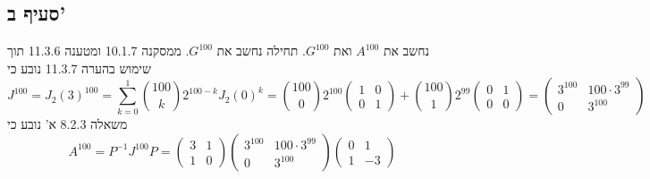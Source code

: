 \subsection{סעיף ב'}
נחשב את $A^{100}$ ואת $G^{100}$.
תחילה נחשב את $G^{100}$. ממסקנה 10.1.7 ומטענה 11.3.6 תוך שימוש בהערה 11.3.7 נובע כי
\[
	J^{100} = {J_2 (3)}^{100} = \sum_{k = 0}^1 \binom{100}{k} 2^{100 - k} {J_2(0)}^k
	= \binom{100}{0} 2^{100} \begin{pmatrix}
		1 & 0 \\
		0 & 1
	\end{pmatrix}
	+ \binom{100}{1} 2^{99} \begin{pmatrix}
		0 & 1 \\
		0 & 0
	\end{pmatrix}
	= \begin{pmatrix}
		3^{100} & 100 \cdot 3^{99} \\
		0 & 3^{100}
	\end{pmatrix}
\]
משאלה 8.2.3 א' נובע כי
\[
	A^{100} = P^{-1} J^{100} P
	= \begin{pmatrix}
		3 & 1 \\
		1 & 0
	\end{pmatrix}
	\begin{pmatrix}
		3^{100} & 100 \cdot 3^{99} \\
		0 & 3^{100}
	\end{pmatrix}
	\begin{pmatrix}
		0 & 1 \\
		1 & -3
	\end{pmatrix}
\]

